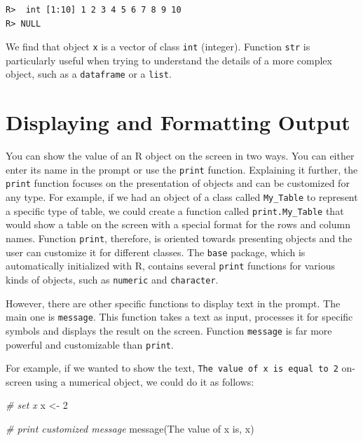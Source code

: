 \documentclass[
  12pt,
]{book}
\newenvironment{Shaded}{\begin{snugshade}}{\end{snugshade}}
\newcommand{\CommentTok}[1]{\textcolor[rgb]{0.37,0.37,0.37}{\textit{#1}}}
\newcommand{\DecValTok}[1]{\textcolor[rgb]{0.06,0.06,0.06}{#1}}
\newcommand{\FunctionTok}[1]{\textcolor[rgb]{0,0,0}{#1}}
\newcommand{\NormalTok}[1]{#1}
\newcommand{\OtherTok}[1]{\textcolor[rgb]{0.37,0.37,0.37}{#1}}
\newcommand{\StringTok}[1]{\textcolor[rgb]{0.5,0.5,0.5}{#1}}
\begin{document}
\begin{verbatim}
R>  int [1:10] 1 2 3 4 5 6 7 8 9 10
R> NULL
\end{verbatim}

We find that object \texttt{x} is a vector of class \texttt{int} (integer). Function \texttt{str} is particularly useful when trying to understand the details of a more complex object, such as a \texttt{dataframe} or a \texttt{list}.

\hypertarget{displaying-and-formatting-output}{%
\section{Displaying and Formatting Output}\label{displaying-and-formatting-output}}

You can show the value of an R object on the screen in two ways. You can either enter its name in the prompt or use the \texttt{print} function. Explaining it further, the \texttt{print} function focuses on the presentation of objects and can be customized for any type. For example, if we had an object of a class called \texttt{My\_Table} to represent a specific type of table, we could create a function called \texttt{print.My\_Table} that would show a table on the screen with a special format for the rows and column names. Function \texttt{print}, therefore, is oriented towards presenting objects and the user can customize it for different classes. The \texttt{base} package, which is automatically initialized with R, contains several \texttt{print} functions for various kinds of objects, such as \texttt{numeric} and \texttt{character}.

However, there are other specific functions to display text in the prompt. The main one is \texttt{message}. This function takes a text as input, processes it for specific symbols and displays the result on the screen. Function \texttt{message} is far more powerful and customizable than \texttt{print}. 

For example, if we wanted to show the text, \texttt{The\ value\ of\ x\ is\ equal\ to\ 2} on-screen using a numerical object, we could do it as follows:

\begin{Shaded}
\begin{Highlighting}[]
\CommentTok{\# set x}
\NormalTok{x }\OtherTok{\textless{}{-}} \DecValTok{2}

\CommentTok{\# print customized message}
\FunctionTok{message}\NormalTok{(}\StringTok{\textquotesingle{}The value of x is\textquotesingle{}}\NormalTok{, x)}
\end{Highlighting}
\end{Shaded}
\end{document}
